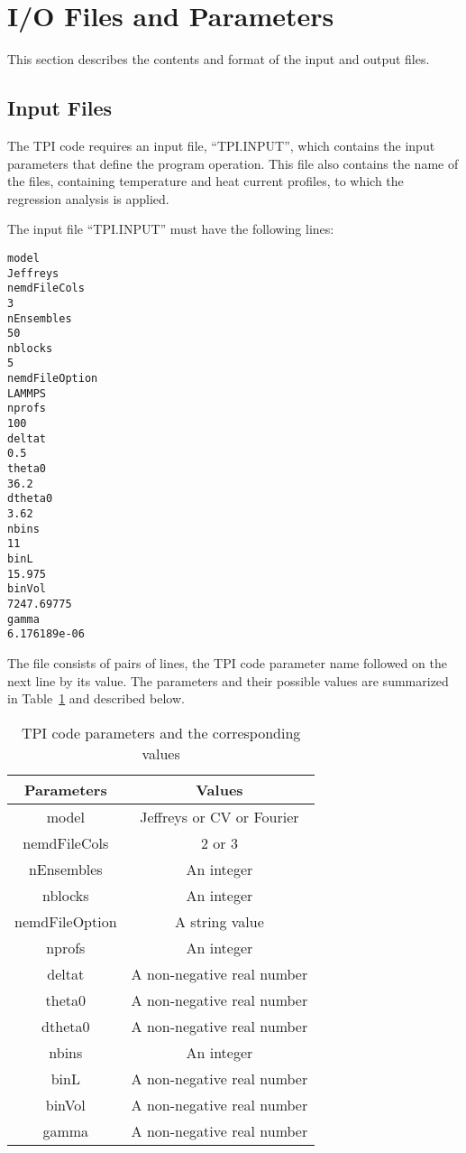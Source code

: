 \documentclass[11pt]{article}
\newcommand{\tpicode}{TPI code\xspace}
\numberwithin{equation}{section}
\begin{document}
\section{I/O Files and Parameters}
This section describes the contents and format of the input and output files.

\subsection{Input Files}
The \tpicode requires an input file, ``TPI.INPUT'', which contains the input
parameters that define the program operation. This file also contains the name
of the files, containing temperature and heat current profiles, to which the
regression analysis is applied.

The input file ``TPI.INPUT'' must have the following lines:
\begin{verbatim}
model
Jeffreys
nemdFileCols
3
nEnsembles
50
nblocks
5
nemdFileOption
LAMMPS
nprofs
100
deltat
0.5
theta0
36.2
dtheta0
3.62
nbins
11
binL
15.975
binVol
7247.69775
gamma
6.176189e-06
\end{verbatim}
The file consists of pairs of lines, the \tpicode parameter name followed on the next line
by its value.  The parameters and their possible values are summarized in 
Table~\ref{table:table01} and described below.
\begin{table}
  \caption{\label{table:table01}\tpicode parameters and the corresponding values}
\centering
  \begin{tabular}{c|c}
  \hline
  \hline
    Parameters     &Values\\ \hline
    model          &Jeffreys or CV or Fourier\\
    nemdFileCols   &2 or 3\\
    nEnsembles     &An integer\\
    nblocks        &An integer\\ 
    nemdFileOption &A string value\\
    nprofs         &An integer\\ 
    deltat         &A non-negative real number\\
    theta0         &A non-negative real number\\
    dtheta0        &A non-negative real number\\
    nbins          &An integer\\ 
    binL           &A non-negative real number\\
    binVol         &A non-negative real number\\
    gamma          &A non-negative real number\\
  \hline
  \hline
  \end{tabular}
\end{table}
\end{document}
